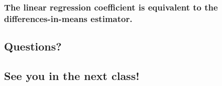 \documentclass[11pt]{article}
\begin{document}
\hypertarget{the-linear-regression-coefficient-is-equivalent-to-the-differences-in-means-estimator.}{%
\subsubsection{The linear regression coefficient is equivalent to the
differences-in-means
estimator.}\label{the-linear-regression-coefficient-is-equivalent-to-the-differences-in-means-estimator.}}

    \hypertarget{questions}{%
\subsection{Questions?}\label{questions}}

    \hypertarget{see-you-in-the-next-class}{%
\subsection{See you in the next
class!}\label{see-you-in-the-next-class}}


    
    
    
\end{document}
